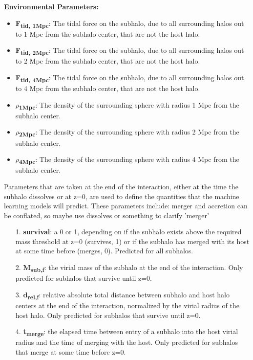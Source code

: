 \documentclass[fleqn,usenatbib]{mnras}
\newcommand\khb[1]{{\color{blue}#1}}
\begin{document}
\vskip 0.1in    
    \noindent\textbf{Environmental Parameters:}
    \begin{itemize}[leftmargin=.4cm,topsep=0pt]
        \item \textbf{F\textsubscript{tid, 1Mpc}}: The tidal force on the subhalo, due to all surrounding halos out to 1 Mpc from the subhalo center, that are not the host halo.
        \item \textbf{F\textsubscript{tid, 2Mpc}}: The tidal force on the subhalo, due to all surrounding halos out to 2 Mpc from the subhalo center, that are not the host halo.
        \item \textbf{F\textsubscript{tid, 4Mpc}}:
        The tidal force on the subhalo, due to all surrounding halos out to 4 Mpc from the subhalo center, that are not the host halo.
        \item \boldmath$\rho$\unboldmath\textbf{\textsubscript{1Mpc}}: The density of the surrounding sphere with radius 1 Mpc from the subhalo center.
        \item \boldmath$\rho$\unboldmath\textbf{\textsubscript{2Mpc}}: The density of the surrounding sphere with radius 2 Mpc from the subhalo center.
        \item \boldmath$\rho$\unboldmath\textbf{\textsubscript{4Mpc}}: The density of the surrounding sphere with radius 4 Mpc from the subhalo center.
    \end{itemize}
\vskip 0.1in  
Parameters that are taken at the end of the interaction, either at the time the subhalo dissolves or at z=0, are used to define the quantities that the machine learning models will predict. These parameters include:
\khb{merger and accretion can be conflated, so maybe use dissolves or something to clarify 'merger'}
    \begin{enumerate}[leftmargin=.4cm]
        \item [1.] \textbf{survival}: a 0 or 1, depending on if the subhalo exists above the required mass threshold at z=0 (survives, 1) or if the subhalo has merged with its host at some time before (merges, 0). Predicted for all subhalos.
        \item [2.] \textbf{M\textsubscript{sub,f}}: the virial mass of the subhalo at the end of the interaction. Only predicted for subhalos that survive until z=0.
        \item [3.] \textbf{d\textsubscript{rel,f}}: relative absolute total distance between subhalo and host halo centers at the end of the interaction, normalized by the virial radius of the host halo. Only predicted for subhalos that survive until z=0.
        \item [4.] \textbf{t\textsubscript{merge}}: the elapsed time between entry of a subhalo into the host virial radius and the time of merging with the host. Only predicted for subhalos that merge at some time before z=0.
    \end{enumerate}
\end{document}
